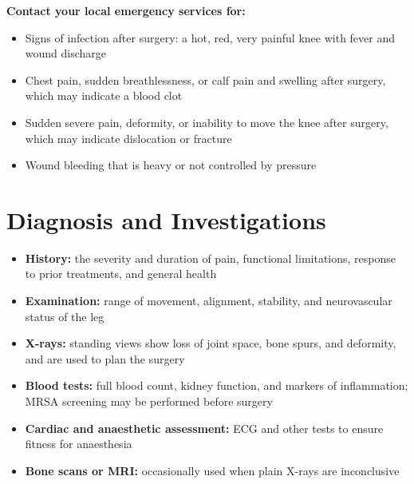 \textbf{Contact your local emergency services for:}
\begin{itemize}
    \item Signs of infection after surgery: a hot, red, very painful knee with fever and wound discharge
    \item Chest pain, sudden breathlessness, or calf pain and swelling after surgery, which may indicate a blood clot
    \item Sudden severe pain, deformity, or inability to move the knee after surgery, which may indicate dislocation or fracture
    \item Wound bleeding that is heavy or not controlled by pressure
\end{itemize}

\section*{Diagnosis and Investigations}
\begin{itemize}
    \item \textbf{History:} the severity and duration of pain, functional limitations, response to prior treatments, and general health
    \item \textbf{Examination:} range of movement, alignment, stability, and neurovascular status of the leg
    \item \textbf{X-rays:} standing views show loss of joint space, bone spurs, and deformity, and are used to plan the surgery
    \item \textbf{Blood tests:} full blood count, kidney function, and markers of inflammation; MRSA screening may be performed before surgery
    \item \textbf{Cardiac and anaesthetic assessment:} ECG and other tests to ensure fitness for anaesthesia
    \item \textbf{Bone scans or MRI:} occasionally used when plain X-rays are inconclusive
\end{itemize}

